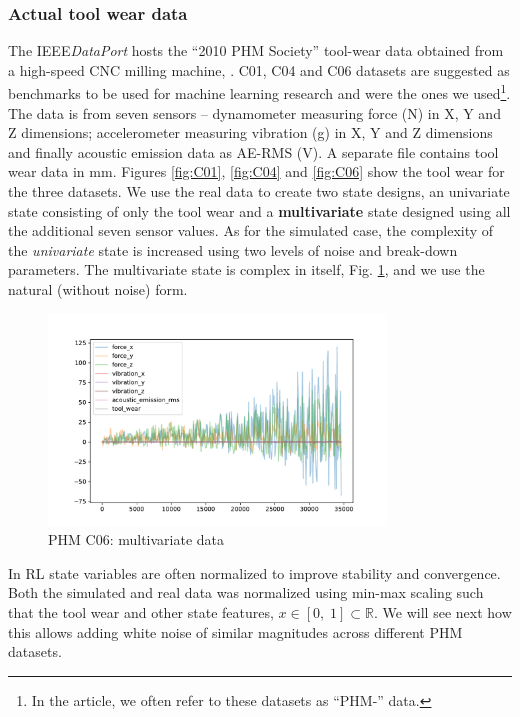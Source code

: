 \documentclass[a4paper, 12pt]{article}
\begin{document}
\subsubsection*{Actual tool wear data}\label{sec:PHMdata}
The IEEE\textit{DataPort} hosts the ``2010 PHM Society'' tool-wear data obtained from a high-speed CNC milling machine, \citep{PHM-dataset}. C01, C04 and C06 datasets are suggested as benchmarks to be used for machine learning research and were the ones we used\footnote{In the article, we often refer to these datasets as ``PHM-'' data.}. The data is from seven sensors -- dynamometer measuring force (N) in X, Y and Z dimensions; accelerometer measuring vibration (g) in X, Y and Z dimensions and finally acoustic emission data as AE-RMS (V). A separate file contains tool wear data in mm. Figures \ref{fig:C01}, \ref{fig:C04} and \ref{fig:C06} show the tool wear for the three datasets. We use the real data to create two state designs, an univariate state consisting of only the tool wear and a \textbf{multivariate} state designed using all the additional seven sensor values. As for the simulated case, the complexity of the \textit{univariate} state is increased using two levels of noise and break-down parameters. The multivariate state is complex in itself, Fig. \ref{fig:PHMMSdata}, and we use the natural (without noise) form.

\begin{figure}[ht]
	\centering
	\includegraphics[width=0.8\textwidth]{PHMMSdata.pdf}  
	\caption{PHM C06: multivariate data}
	\label{fig:PHMMSdata}
\end{figure} 

In RL state variables are often normalized to improve stability and convergence. Both the simulated and real data was normalized using min-max scaling such that the tool wear and other state features, $x \in [0,\;1] \subset \mathbb{R} $. We will see next how this allows adding white noise of similar magnitudes across different PHM datasets.
\end{document}
